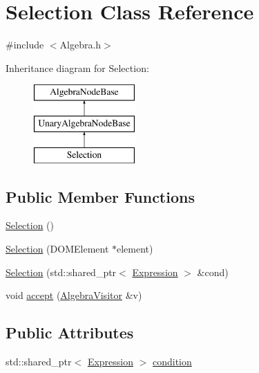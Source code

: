 \hypertarget{class_selection}{\section{Selection Class Reference}
\label{class_selection}
}


{\ttfamily \#include $<$Algebra.\+h$>$}

Inheritance diagram for Selection\+:\begin{figure}[H]
\begin{center}
\leavevmode
\includegraphics[height=3.000000cm]{class_selection}
\end{center}
\end{figure}
\subsection*{Public Member Functions}
\begin{DoxyCompactItemize}
\item 
\hyperlink{class_selection_a53d1bd270d6d257d34d5bc8d50028049}{Selection} ()
\item 
\hyperlink{class_selection_a83b3073a2d490708256e3dc725560836}{Selection} (D\+O\+M\+Element $\ast$element)
\item 
\hyperlink{class_selection_a086ad5ebceb2f48c7b66c150c4f1d92c}{Selection} (std\+::shared\+\_\+ptr$<$ \hyperlink{class_expression}{Expression} $>$ \&cond)
\item 
void \hyperlink{class_selection_afe7f64aed777d583797f1c9c13b378ac}{accept} (\hyperlink{class_algebra_visitor}{Algebra\+Visitor} \&v)
\end{DoxyCompactItemize}
\subsection*{Public Attributes}
\begin{DoxyCompactItemize}
\item 
std\+::shared\+\_\+ptr$<$ \hyperlink{class_expression}{Expression} $>$ \hyperlink{class_selection_a2356634cb924e5b5814c4d2bfee51d65}{condition}
\end{DoxyCompactItemize}


